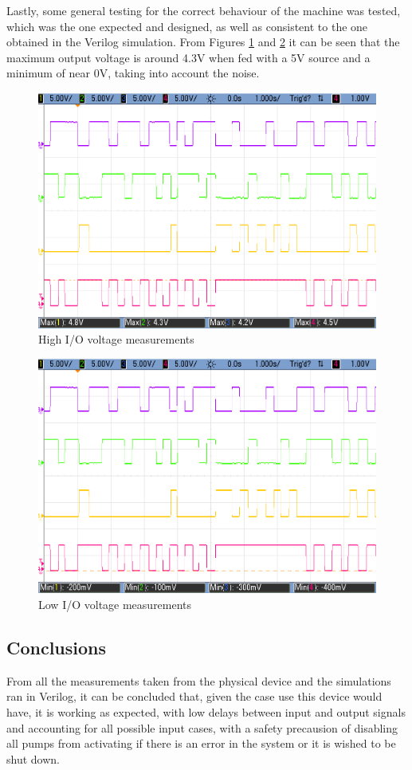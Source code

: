 Lastly, some general testing for the correct behaviour of the machine was tested, which was the one expected and
designed, as well as consistent to the one obtained in the Verilog simulation. From Figures \ref{fig:moore_max} and 
\ref{fig:moore_min} it can be seen that the maximum output voltage is around 4.3V when fed with a 5V source and a
minimum of near 0V, taking into account the noise.

\begin{figure}[ht]
    \begin{center}
        \includegraphics[width=0.75\linewidth]{./images/e3e1_1s4i_2b1_2b2_v1.png}
        \caption{High I/O voltage measurements}
        \label{fig:moore_max}
    \end{center}
\end{figure}

\begin{figure}[ht]
    \begin{center}
        \includegraphics[width=0.75\linewidth]{./images/e3e1_1s4i_2b1_2b2_v0.png}
        \caption{Low I/O voltage measurements}
        \label{fig:moore_min}
    \end{center}
\end{figure}

\newpage
\subsection{Conclusions}
From all the measurements taken from the physical device and the simulations ran in Verilog, it can be concluded
that, given the case use this device would have, it is working as expected, with low delays between input and
output signals and accounting for all possible input cases, with a safety precausion of disabling all pumps from
activating if there is an error in the system or it is wished to be shut down.